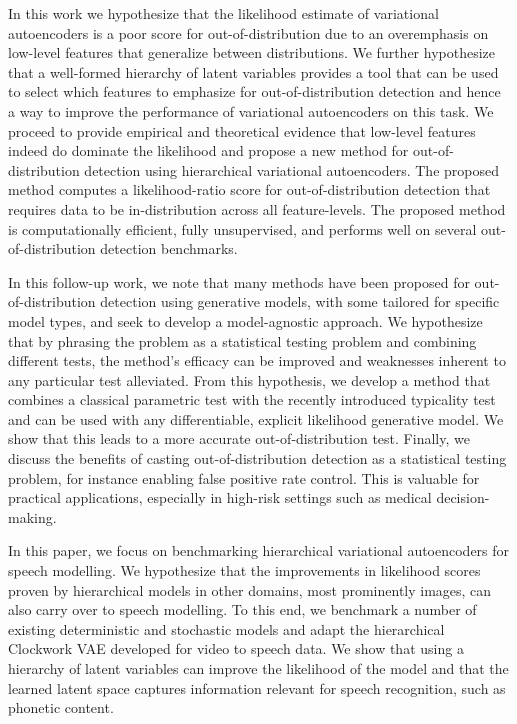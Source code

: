 In this work we hypothesize that the likelihood estimate of variational autoencoders is a poor score for out-of-distribution due to an overemphasis on low-level features that generalize between distributions. 
We further hypothesize that a well-formed hierarchy of latent variables provides a tool that can be used to select which features to emphasize for out-of-distribution detection and hence a way to improve the performance of variational autoencoders on this task. 
We proceed to provide empirical and theoretical evidence that low-level features indeed do dominate the likelihood and propose a new method for out-of-distribution detection using hierarchical variational autoencoders. 
The proposed method computes a likelihood-ratio score for out-of-distribution detection that requires data to be in-distribution across all feature-levels. 
The proposed method is computationally efficient, fully unsupervised, and performs well on several out-of-distribution detection benchmarks. 

In this follow-up work, we note that many methods have been proposed for out-of-distribution detection using generative models, with some tailored for specific model types, and seek to develop a model-agnostic approach. 
We hypothesize that by phrasing the problem as a statistical testing problem and combining different tests, the method's efficacy can be improved and weaknesses inherent to any particular test alleviated. 
From this hypothesis, we develop a method that combines a classical parametric test with the recently introduced typicality test and can be used with any differentiable, explicit likelihood generative model.
We show that this leads to a more accurate out-of-distribution test. 
Finally, we discuss the benefits of casting out-of-distribution detection as a statistical testing problem, for instance enabling false positive rate control. This is valuable for practical applications, especially in high-risk settings such as medical decision-making.

In this paper, we focus on benchmarking hierarchical variational autoencoders for speech modelling. 
We hypothesize that the improvements in likelihood scores proven by hierarchical models in other domains, most prominently images, can also carry over to speech modelling. 
To this end, we benchmark a number of existing deterministic and stochastic models and adapt the hierarchical Clockwork VAE developed for video \parencite{saxena_clockwork_2021} to speech data. 
We show that using a hierarchy of latent variables can improve the likelihood of the model and that the learned latent space captures information relevant for speech recognition, such as phonetic content. 


